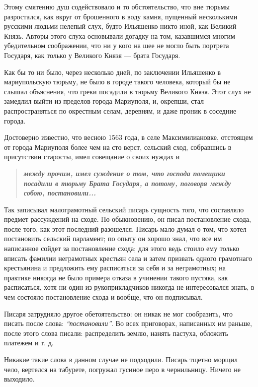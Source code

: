 \documentclass[a4paper,20pt]{article}
\begin{document}
Этому смятению душ содействовало и то обстоятельство, что вне тюрьмы
разростался, как вкруг от брошенного в воду камня, пущенный несколькими
русскими людьми нелепый слух, будто Ильяшенко никто иной, как Великий Князь.
Авторы этого слуха основывали догадку на том, казавшимся многим убедительном
соображении, что ни у кого на шее не могло быть портрета Государя, как только у
Великого Князя — брата Государя.

Как бы то ни было, через несколько дней, по заключении Ильяшенко в
мариупольскую тюрьму, не было в городе такого человека, который бы не слышал
объяснения, что греки посадили в тюрьму Великого Князя. Этот слух не замедлил
выйти из пределов города Мариуполя, и, окрепши, стал распространяться по
окрестным селам, деревням, и даже проник в соседние города.

Достоверно известно, что весною 1563 года, в селе Максимилиановке, отстоящем от
города Мариуполя более чем на сто верст, сельский сход, собравшись в
присутствии старосты, имел совещание о своих нуждах и 
\begin{quote}
\em\bfseries
между прочим, имел суждение о том, что господа помещики посадили в тюрьму Брата
Государя, а потому, поговоря между собою, постановили...
\end{quote}

Так записывал малограмотный сельский писарь сущность того, что составляло
предмет рассуждений на сходе. По обыкновению, он писал постановление схода,
после того, как этот последний разошелся. Писарь мало думал о том, что хотел
постановить сельский парламент; по опыту он хорошо знал, что все им написанное
сойдет за постановление схода; для этого ведь стоило ему только вписать фамилии
неграмотных крестьян села и затем призвать одного грамотнаго крестьянина и
предложить ему расписаться за себя и за неграмотных; на практике никогда не
было примера отказа в учинении такого пустяка, как расписаться, хотя ни один из
рукоприкладчиков никогда не интересовался знать, в чем состояло постановление
схода и вообще, что он подписывал.

Писаря затрудняло другое обетоятельство: он никак
не мог сообразить, что писать после слова: \emph{``постановили''}.
Во всех приговорах, написанных им раньше, после этого слова писали:
распределить землю, нанять пастуха, обложить платежем и т. д.

Никакие такие слова в данном случае не подходили. Писарь тщетно морщил чело,
вертелся на табурете, погружал гусиное перо в чернильницу.  Ничего не выходило.
\end{document}
